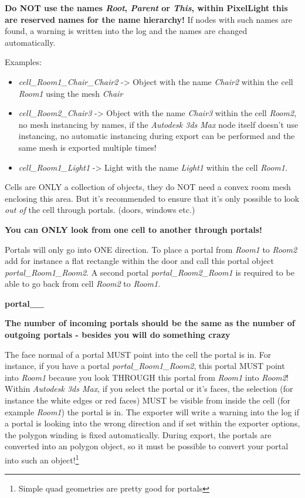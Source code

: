 \textbf{Do NOT use the names \emph{Root}, \emph{Parent} or \emph{This}, within PixelLight this are reserved names for the name hierarchy!} If nodes with such names are found, a warning is written into the log and the names are changed automatically.

Examples:
\begin{itemize}
\item{\emph{cell\_Room1\_Chair\_Chair2} -> Object with the name \emph{Chair2} within the cell \emph{Room1} using the mesh \emph{Chair}}
\item{\emph{cell\_Room2\_Chair3} -> Object with the name \emph{Chair3} within the cell \emph{Room2}, no mesh instancing by names, if the \emph{Autodesk 3ds Max} node itself doesn't use instancing, no automatic instancing during export can be performed and the same mesh is exported multiple times!}
\item{\emph{cell\_Room1\_Light1} -> Light with the name \emph{Light1} within the cell \emph{Room1}.}
\end{itemize}

Cells are ONLY a collection of objects, they do NOT need a convex room mesh enclosing this area. But it's recommended to ensure that it's only possible to look \emph{out of} the cell through portals. (doors, windows etc.)

\textbf{You can ONLY look from one cell to another through portals!}

Portals will only go into ONE direction. To place a portal from \emph{Room1} to \emph{Room2} add for instance a flat rectangle within the door and call this portal object \emph{portal\_Room1\_Room2}. A second portal \emph{portal\_Room2\_Room1} is required to be able to go back from cell \emph{Room2} to \emph{Room1}.

\textbf{portal\_<from cell>\_<to cell>}

\textbf{The number of incoming portals should be the same as the number of outgoing portals - besides you will do something crazy}

The face normal of a portal MUST point into the cell the portal is in. For instance, if you have a portal \emph{portal\_Room1\_Room2}, this portal MUST point into \emph{Room1} because you look THROUGH this portal from \emph{Room1} into \emph{Room2}! Within \emph{Autodesk 3ds Max}, if you select the portal or it's faces, the selection (for instance the white edges or red faces) MUST be visible from inside the cell (for example \emph{Room1}) the portal is in. The exporter will write a warning into the log if a portal is looking into the wrong direction and if set within the exporter options, the polygon winding is fixed automatically. During export, the portals are converted into an polygon object, so it must be possible to convert your portal into such an object!\footnote{Simple quad geometries are pretty good for portals}

